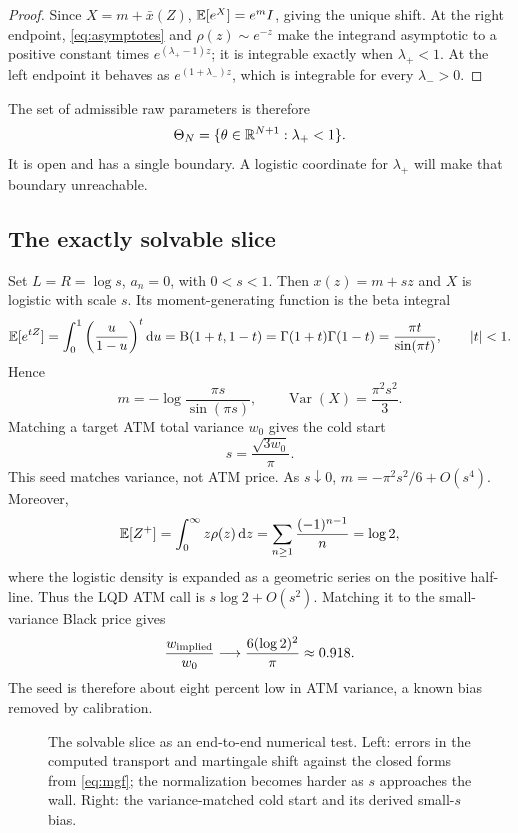 \begin{proof}
Since $X=m+\bar x(Z)$, $\mathbb{E}[e^X]=e^mI$, giving the unique shift.  At the
right endpoint, \eqref{eq:asymptotes} and $\rho(z)\sim e^{-z}$ make the
integrand asymptotic to a positive constant times
$e^{(\lambda_+-1)z}$; it is integrable exactly when $\lambda_+<1$.  At the
left endpoint it behaves as $e^{(1+\lambda_-)z}$, which is integrable for
every $\lambda_->0$.
\end{proof}

The set of admissible raw parameters is therefore
\begin{equation}
\Theta_N=\{\theta\in\mathbb{R}^{N+1}:\lambda_+<1\}.
\label{eq:admissible}
\end{equation}
It is open and has a single boundary.  A logistic coordinate for
$\lambda_+$ will make that boundary unreachable.

\subsection{The exactly solvable slice}
\label{sec:constspeed}

Set $L=R=\log s$, $a_n=0$, with $0<s<1$.  Then
$x(z)=m+sz$ and $X$ is logistic with scale $s$.  Its moment-generating
function is the beta integral
\begin{equation}
\mathbb{E}[e^{tZ}]
=\int_0^1\left(\frac{u}{1-u}\right)^t\mathrm{d} u
=\mathrm B(1+t,1-t)
=\Gamma(1+t)\Gamma(1-t)
=\frac{\pi t}{\sin(\pi t)},\qquad |t|<1.
\label{eq:mgf}
\end{equation}
Hence
\[
m=-\log\frac{\pi s}{\sin(\pi s)},\qquad
\operatorname{Var}(X)=\frac{\pi^2s^2}{3}.
\]
Matching a target ATM total variance $w_0$ gives the cold start
\begin{equation}
s=\frac{\sqrt{3w_0}}{\pi}.
\label{eq:coldstart}
\end{equation}
This seed matches variance, not ATM price.  As $s\downarrow0$,
$m=-\pi^2s^2/6+O(s^4)$.  Moreover,
\[
\mathbb{E}[Z^+]=\int_0^\infty z\rho(z)\,\mathrm{d} z
=\sum_{n\ge1}\frac{(-1)^{n-1}}n=\log2,
\]
where the logistic density is expanded as a geometric series on the positive
half-line.  Thus the LQD ATM call is $s\log2+O(s^2)$.  Matching it to the
small-variance Black price gives
\[
\frac{w_{\rm implied}}{w_0}\longrightarrow
\frac{6(\log2)^2}{\pi}\approx0.918.
\]
The seed is therefore about eight percent low in ATM variance, a known bias
removed by calibration.

\begin{figure}[htbp]
\centering
{}
\caption{The solvable slice as an end-to-end numerical test.  Left: errors in
the computed transport and martingale shift against the closed forms from
\eqref{eq:mgf}; the normalization becomes harder as $s$ approaches the wall.
Right: the variance-matched cold start and its derived small-$s$ bias.}
\label{fig:exact}
\end{figure}
